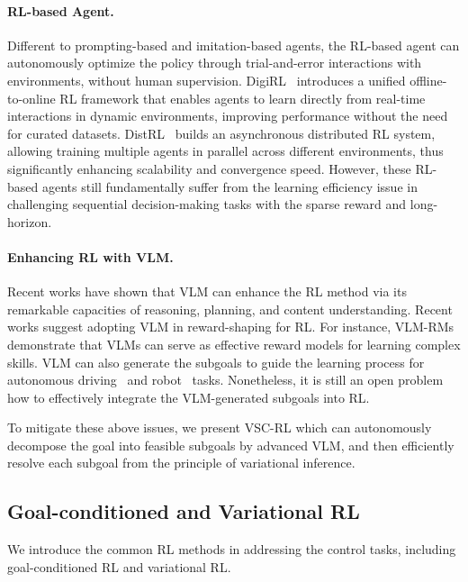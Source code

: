 \paragraph{RL-based Agent.}
Different to prompting-based and imitation-based agents, the RL-based agent can autonomously optimize the policy through trial-and-error interactions with environments, without human supervision.
DigiRL~\cite{bai2024digirl} introduces a unified offline-to-online RL framework that enables agents to learn directly from real-time interactions in dynamic environments, improving performance without the need for curated datasets.
DistRL~\cite{wang2024distrl} builds an asynchronous distributed RL system, allowing training multiple agents in parallel across different environments, thus significantly enhancing scalability and convergence speed.
However, these RL-based agents still fundamentally suffer from the learning efficiency issue in challenging sequential decision-making tasks with the sparse reward and long-horizon.


\paragraph{Enhancing RL with VLM.}
Recent works have shown that VLM can enhance the RL method via its remarkable capacities of reasoning, planning, and content understanding.
Recent works suggest adopting VLM in reward-shaping for RL.
For instance, VLM-RMs~\citep{rocamonde2023vision} demonstrate that VLMs can serve as effective reward models for learning complex skills.
VLM can also generate the subgoals to guide the learning process for autonomous driving~\citep{pan2024vlp} and robot~\cite{yang2024guiding} tasks.
Nonetheless, it is still an open problem how to effectively integrate the VLM-generated subgoals into RL.

To mitigate these above issues, we present VSC-RL which can autonomously decompose the goal into feasible subgoals by advanced VLM, and then efficiently resolve each subgoal from the principle of variational inference.


\subsection{Goal-conditioned and Variational RL}
We introduce the common RL methods in addressing the control tasks, including goal-conditioned RL and variational RL.

